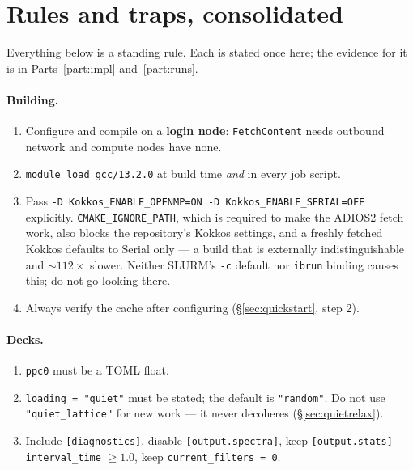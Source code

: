 \documentclass[11pt,a4paper]{article}
\newcommand{\code}[1]{\texttt{\small #1}}
\begin{document}
\section{Rules and traps, consolidated}
\label{sec:rules}

Everything below is a standing rule. Each is stated once here; the evidence for it is
in Parts~\ref{part:impl} and~\ref{part:runs}.

\paragraph{Building.}
\begin{enumerate}[nosep]
  \item Configure and compile on a \textbf{login node}: \code{FetchContent} needs
        outbound network and compute nodes have none.
  \item \code{module load gcc/13.2.0} at build time \emph{and} in every job script.
  \item Pass \code{-D Kokkos\_ENABLE\_OPENMP=ON -D Kokkos\_ENABLE\_SERIAL=OFF}
        explicitly. \code{CMAKE\_IGNORE\_PATH}, which is required to make the ADIOS2
        fetch work, also blocks the repository's Kokkos settings, and a freshly
        fetched Kokkos defaults to Serial only --- a build that is externally
        indistinguishable and ${\sim}112\times$ slower. Neither SLURM's \code{-c}
        default nor \code{ibrun} binding causes this; do not go looking there.
  \item Always verify the cache after configuring
        (\S\ref{sec:quickstart}, step 2).
\end{enumerate}

\paragraph{Decks.}
\begin{enumerate}
  \item \code{ppc0} must be a TOML float.
  \item \code{loading = "quiet"} must be stated; the default is \code{"random"}.
        Do not use \code{"quiet\_lattice"} for new work --- it never decoheres
        (\S\ref{sec:quietrelax}).
  \item Include \code{[diagnostics]}, disable \code{[output.spectra]}, keep
        \code{[output.stats] interval\_time} $\ge 1.0$, keep
        \code{current\_filters = 0}.
\end{enumerate}
\end{document}
